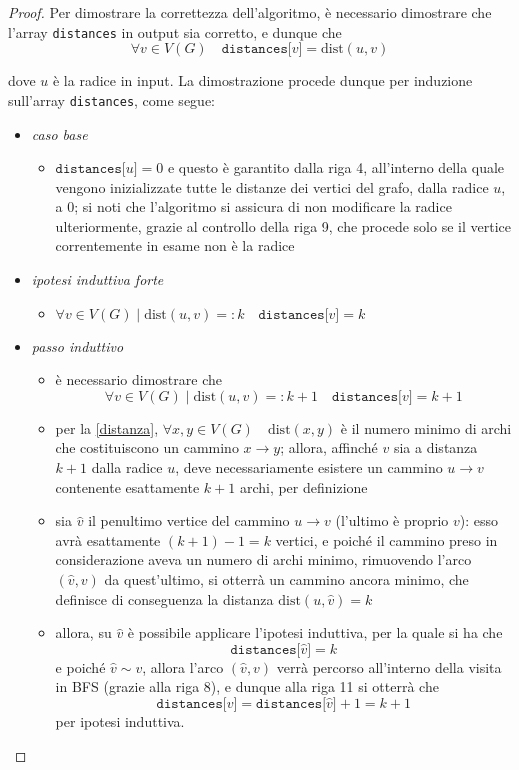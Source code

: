 \documentclass[14pt]{extreport}
\theoremstyle{definition}
\theoremstyle{definition}
\begin{document}
\begin{proof}
    Per dimostrare la correttezza dell'algoritmo, è necessario dimostrare che l'array \texttt{distances} in output sia corretto, e dunque che $$\forall v \in V(G) \quad \texttt{distances[}v\texttt{]} = \mathrm{dist}(u, v)$$

    dove $u$ è la radice in input. La dimostrazione procede dunque per induzione sull'array \texttt{distances}, come segue:

    \begin{itemize}
        \item \textit{caso base}
            \begin{itemize}
                \item $\texttt{distances[}u\texttt{]} = 0$ e questo è garantito dalla riga 4, all'interno della quale vengono inizializzate tutte le distanze dei vertici del grafo, dalla radice $u$, a 0; si noti che l'algoritmo si assicura di non modificare la radice ulteriormente, grazie al controllo della riga 9, che procede solo se il vertice correntemente in esame non è la radice
            \end{itemize}
        \item \textit{ipotesi induttiva forte}
            \begin{itemize}
                \item $\forall v \in V(G) \mid \mathrm{dist}(u, v) =: k \quad \texttt{distances[}v\texttt{]} = k$
            \end{itemize}
        \item \textit{passo induttivo}
            \begin{itemize}
                \item è necessario dimostrare che $$\forall v \in V(G) \mid \mathrm{dist}(u, v) =: k + 1 \quad \texttt{distances[}v\texttt{]} = k + 1$$
                \item per la \cref{distanza}, $\forall x, y \in V(G) \quad \mathrm{dist}(x, y)$ è il numero minimo di archi che costituiscono un cammino $x \rightarrow y$; allora, affinché $v$ sia a distanza $k + 1$ dalla radice $u$, deve necessariamente esistere un cammino $u \rightarrow v$ contenente esattamente $k + 1$ archi, per definizione
                \item sia $\hat v$ il penultimo vertice del cammino $u \rightarrow v$ (l'ultimo è proprio $v$): esso avrà esattamente $(k + 1) - 1 = k$ vertici, e poiché il cammino preso in considerazione aveva un numero di archi minimo, rimuovendo l'arco $(\hat v, v)$ da quest'ultimo, si otterrà un cammino ancora minimo, che definisce di conseguenza la distanza $\mathrm{dist}(u, \hat v) = k$
                \item allora, su $\hat v$ è possibile applicare l'ipotesi induttiva, per la quale si ha che $$\texttt{distances[}\hat v\texttt{]} = k$$ e poiché $\hat v \sim v$, allora l'arco $(\hat v, v)$ verrà percorso all'interno della visita in BFS (grazie alla riga 8), e dunque alla riga 11 si otterrà che $$\texttt{distances[}v\texttt{]} = \texttt{distances[}\hat v\texttt{]} + 1 = k + 1$$ per ipotesi induttiva.
            \end{itemize}
    \end{itemize}
\end{proof}
\end{document}
